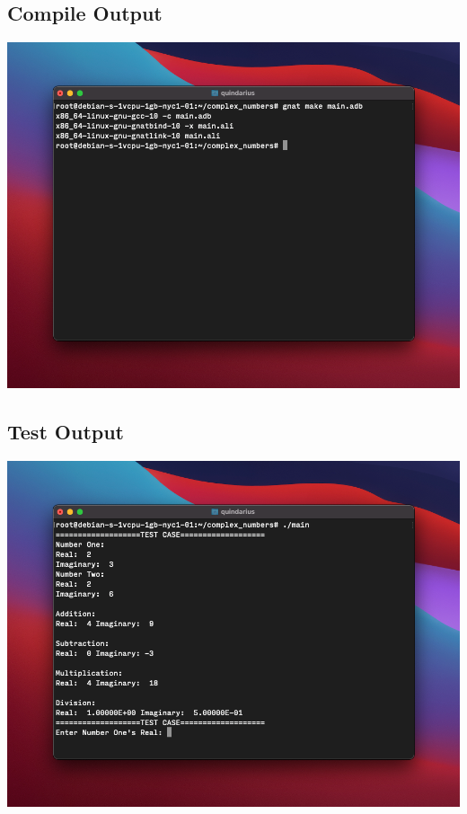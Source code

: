 \documentclass{report}
\begin{document}
\subsection*{Compile Output}
\includegraphics[width = \textwidth]{images/ada2}
\subsection*{Test Output}
\includegraphics[width = \textwidth]{images/ada3}
\end{document}
